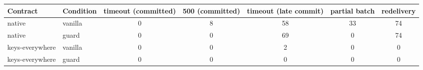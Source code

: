 \begin{tabular}{llccccc}
\toprule
Contract & Condition & timeout (committed) & 500 (committed) & timeout (late commit) & partial batch & redelivery \\
\midrule
native & vanilla & 0 & 8 & 58 & 33 & 74 \\
native & guard & 0 & 0 & 69 & 0 & 74 \\
keys-everywhere & vanilla & 0 & 0 & 2 & 0 & 0 \\
keys-everywhere & guard & 0 & 0 & 0 & 0 & 0 \\
\bottomrule
\end{tabular}